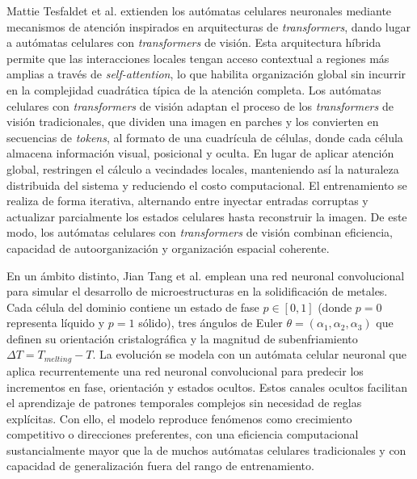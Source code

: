Mattie Tesfaldet et al. \cite{Tesfaldet2022_vitca} extienden los autómatas celulares neuronales mediante mecanismos de atención inspirados en arquitecturas de \textit{transformers}, dando lugar a autómatas celulares con \textit{transformers} de visión. Esta arquitectura híbrida permite que las interacciones locales tengan acceso contextual a regiones más amplias a través de \textit{self-attention}, lo que habilita organización global sin incurrir en la complejidad cuadrática típica de la atención completa. Los autómatas celulares con \textit{transformers} de visión adaptan el proceso de los \textit{transformers} de visión tradicionales, que dividen una imagen en parches y los convierten en secuencias de \textit{tokens}, al formato de una cuadrícula de células, donde cada célula almacena información visual, posicional y oculta. En lugar de aplicar atención global, restringen el cálculo a vecindades locales, manteniendo así la naturaleza distribuida del sistema y reduciendo el costo computacional. El entrenamiento se realiza de forma iterativa, alternando entre inyectar entradas corruptas y actualizar parcialmente los estados celulares hasta reconstruir la imagen. De este modo, los autómatas celulares con \textit{transformers} de visión combinan eficiencia, capacidad de autoorganización y organización espacial coherente.

En un ámbito distinto, Jian Tang et al. \cite{Jian2023_nca} emplean una red neuronal convolucional para simular el desarrollo de microestructuras en la solidificación de metales. Cada célula del dominio contiene un estado de fase $p \in [0,1]$ (donde $p=0$ representa líquido y $p=1$ sólido), tres ángulos de Euler $\theta=(\alpha_1,\alpha_2,\alpha_3)$ que definen su orientación cristalográfica y la magnitud de subenfriamiento $\Delta T=T_{melting}-T$. La evolución se modela con un autómata celular neuronal que aplica recurrentemente una red neuronal convolucional para predecir los incrementos en fase, orientación y estados ocultos. Estos canales ocultos facilitan el aprendizaje de patrones temporales complejos sin necesidad de reglas explícitas. Con ello, el modelo reproduce fenómenos como crecimiento competitivo o direcciones preferentes, con una eficiencia computacional sustancialmente mayor que la de muchos autómatas celulares tradicionales y con capacidad de generalización fuera del rango de entrenamiento.

